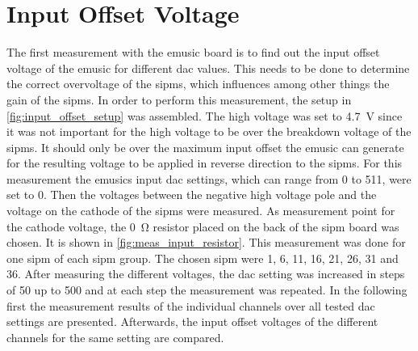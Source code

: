 




\section{Input Offset Voltage}
The first measurement with the \ac{emusic} board is to find out the input offset voltage of the \ac{emusic} for different \ac{dac} values.
This needs to be done to determine the correct overvoltage of the \acp{sipm}, which influences among other things the gain of the \acp{sipm}.
In order to perform this measurement, the setup in \autoref{fig:input_offset_setup} was assembled.
The high voltage was set to \SI{4.7}{\volt} since it was not important for the high voltage to be over the breakdown voltage of the \acp{sipm}.
It should only be over the maximum input offset the \ac{emusic} can generate for the resulting voltage to be applied in reverse direction to the \acp{sipm}.
For this measurement the \ac{emusic}s input \ac{dac} settings, which can range from 0 to \SI{511}{\dacu}, were set to \SI{0}{\dacu}.
Then the voltages between the negative high voltage pole and the voltage on the cathode of the \acp{sipm} were measured.
As measurement point for the cathode voltage, the \SI{0}{\ohm} resistor placed on the back of the \ac{sipm} board was chosen.
It is shown in \autoref{fig:meas_input_resistor}.
This measurement was done for one \ac{sipm} of each \ac{sipm} group.
The chosen \ac{sipm} were 1, 6, 11, 16, 21, 26, 31 and 36.
After measuring the different voltages, the \ac{dac} setting was increased in steps of \SI{50}{\dacu} up to \SI{500}{\dacu} and at each step the measurement was repeated.
In the following first the measurement results of the individual channels over all tested \ac{dac} settings are presented.
Afterwards, the input offset voltages of the different channels for the same setting are compared.

